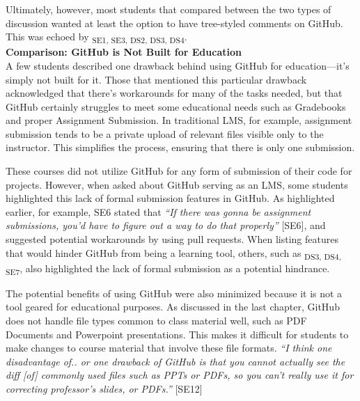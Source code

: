
Ultimately, however, most students that compared between the two types of discussion wanted at least the option to have tree-styled comments on GitHub. This was echoed by \textsubscript{SE1, SE3, DS2, DS3, DS4}. \\

\textbf{Comparison: GitHub is Not Built for Education} \\
A few students described one drawback behind using GitHub for education---it's simply not built for it. Those that mentioned this particular drawback acknowledged that there's workarounds for many of the tasks needed, but that GitHub certainly struggles to meet some educational needs such as Gradebooks and proper Assignment Submission. In traditional LMS, for example, assignment submission tends to be a private upload of relevant files visible only to the instructor. This simplifies the process, ensuring that there is only one submission.

These courses did not utilize GitHub for any form of submission of their code for projects. However, when asked about GitHub serving as an LMS, some students highlighted this lack of formal submission features in GitHub. As highlighted earlier, for example, SE6 stated that \textit{``If there was gonna be assignment submissions, you'd have to figure out a way to do that properly''} [SE6], and suggested potential workarounds by using pull requests. When listing features that would hinder GitHub from being a learning tool, others, such as \textsubscript{DS3, DS4, SE7}, also highlighted the lack of formal submission as a potential hindrance.

The potential benefits of using GitHub were also minimized because it is not a tool geared for educational purposes. As discussed in the last chapter, GitHub does not handle file types common to class material well, such as PDF Documents and Powerpoint presentations. This makes it difficult for students to make changes to course material that involve these file formats. \textit{``I think one disadvantage of.. or one drawback of GitHub is that you cannot actually see the diff [of] commonly used files such as PPTs or PDFs, so you can't really use it for correcting professor's slides, or PDFs.''} [SE12]

